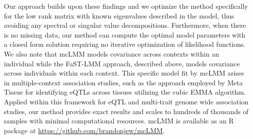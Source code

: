     Our approach builds upon these findings and we optimize the method specifically for the low rank matrix with known eigenvalues described in the model, thus avoiding any spectral or singular value decompositions. Furthermore, when there is no missing data, our method can compute the optimal model parameters with a closed form solution requiring no iterative optimization of likelihood functions. We also note that mcLMM models covariance across contexts within an individual while the FaST-LMM approach, described above, models covariance across individuals within each context. This specific model fit by mcLMM arises in multiple-context association studies, such as the approach employed by Meta Tissue \cite{Sul} for identifying eQTLs across tissues utilizing the cubic EMMA algorithm. Applied within this framework for eQTL and multi-trait genome wide association studies, our method provides exact results and scales to hundreds of thousands of samples with minimal computational resources. mcLMM is available as an R package at \url{https://github.com/brandonjew/mcLMM}.